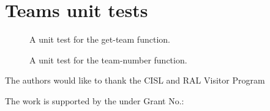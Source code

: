 
%




\appendix
\section{Teams unit tests}

\begin{figure}
  
  \caption{A unit test for the get-team function.\label{figure:get-team-test}}
\end{figure}

%

\begin{figure}
  
  \caption{A unit test for the team-number function.\label{figure:team-number-test}}
\end{figure}


\begin{acks}
  The authors would like to thank the CISL and RAL Visitor Program

  The work is
  supported by the  under Grant
  No.:~

\end{acks}
